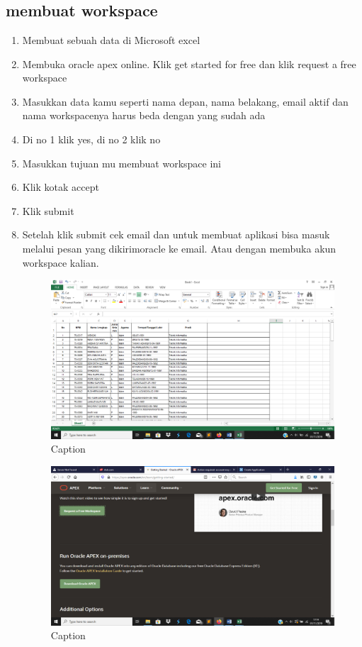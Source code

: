 \chapter{}

\section{membuat workspace}
\begin{enumerate}
    \item Membuat  sebuah data di Microsoft excel
    \item Membuka oracle apex online. Klik get started for free dan klik request a free workspace
    \item Masukkan data kamu seperti nama depan, nama belakang, email aktif dan nama workspacenya harus beda dengan yang sudah ada
    \item Di no 1 klik yes, di no 2 klik no
    \item Masukkan tujuan mu membuat workspace ini
    \item Klik kotak accept
    \item Klik submit
\item Setelah klik submit cek email dan untuk membuat aplikasi bisa masuk melalui pesan yang dikirimoracle ke email. Atau dengan membuka akun workspace kalian.
    \begin{figure}[!htbp]
        \centering
        \includegraphics[scale=0.3]{figure/1.png}
        \caption{Caption}
        \label{fig:my_label}
    \end{figure}
   
    \begin{figure}[!htbp]
        \centering
        \includegraphics[scale=0.3]{figure/2.png}
        \caption{Caption}
        \label{fig:my_label}
    \end{figure}
    

\end{enumerate}
